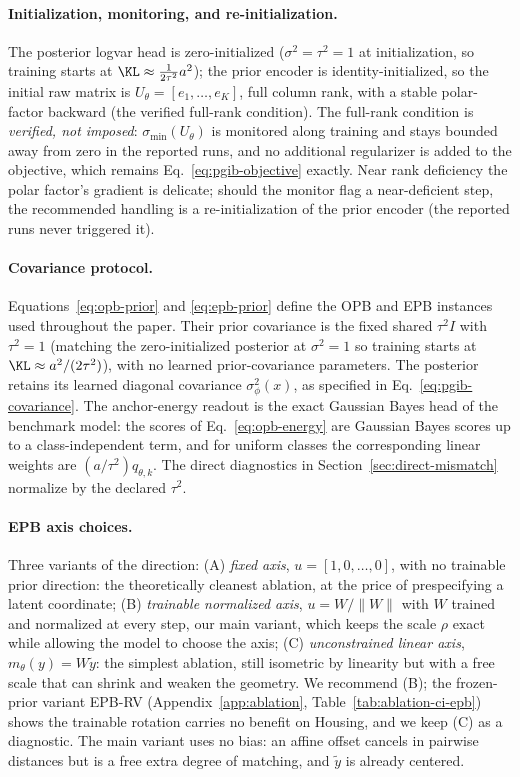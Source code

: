 \paragraph{Initialization, monitoring, and re-initialization.} The posterior logvar
head is zero-initialized ($\sigma^2 = \tau^2 = 1$ at initialization, so training
starts at $\KL \approx \tfrac{1}{2\tau^2} a^2$); the prior encoder is
identity-initialized, so the initial raw matrix is $U_\theta = [e_1, \dots, e_K]$,
full column rank, with a stable polar-factor backward (the verified full-rank
condition). The full-rank condition is \emph{verified, not
imposed}: $\sigma_{\min}(U_\theta)$ is monitored along training and stays bounded
away from zero in the reported runs, and no additional regularizer is added to the
objective, which remains Eq.~\eqref{eq:pgib-objective} exactly. Near rank deficiency
the polar factor's gradient is delicate; should the monitor flag a near-deficient
step, the recommended handling is a re-initialization of the prior encoder (the
reported runs never triggered it).

\paragraph{Covariance protocol.} Equations~\eqref{eq:opb-prior} and
\eqref{eq:epb-prior} define the OPB and EPB instances used throughout the paper.
Their prior covariance is the fixed shared $\tau^2I$ with $\tau^2=1$ (matching the
zero-initialized posterior at $\sigma^2=1$ so training starts at
$\KL\approx a^2/(2\tau^2)$), with no learned prior-covariance parameters. The
posterior retains its learned diagonal covariance $\sigma^2_\phi(x)$, as specified
in Eq.~\eqref{eq:pgib-covariance}. The anchor-energy readout is the exact Gaussian
Bayes head of the benchmark model: the scores of Eq.~\eqref{eq:opb-energy} are
Gaussian Bayes scores up to a class-independent term, and for uniform classes the
corresponding linear weights are $(a/\tau^2)q_{\theta,k}$. The direct diagnostics
in Section~\ref{sec:direct-mismatch}
normalize by the declared $\tau^2$.

\paragraph{EPB axis choices.} Three variants of the direction: (A) \emph{fixed
axis}, $u = [1, 0, \dots, 0]$, with no trainable prior direction: the
theoretically cleanest ablation, at the price of prespecifying a latent coordinate;
(B) \emph{trainable normalized axis}, $u = W/\|W\|$ with $W$ trained and normalized
at every step, our main variant, which keeps the scale $\rho$ exact while allowing
the model to choose the axis; (C) \emph{unconstrained linear axis},
$m_\theta(y) = W \tilde y$: the simplest ablation, still isometric by linearity but
with a free scale that can shrink and weaken the geometry. We recommend (B); the
frozen-prior variant EPB-RV (Appendix~\ref{app:ablation},
Table~\ref{tab:ablation-ci-epb}) shows the trainable rotation carries no benefit
on Housing, and we keep (C) as a diagnostic. The main variant uses no bias: an affine offset cancels in pairwise
distances but is a free extra degree of matching, and $\tilde y$ is already centered.

